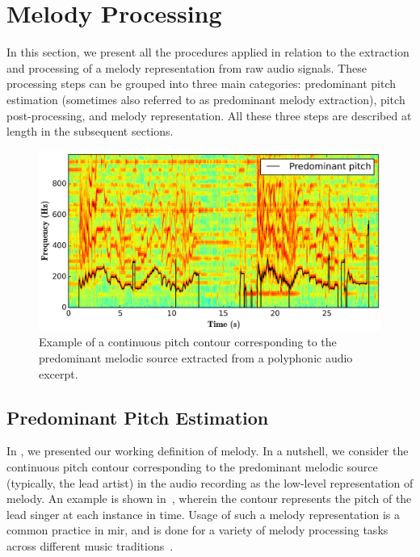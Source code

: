 {\section{Melody Processing}
\label{sec:data_preprocessing_melody_processing}

In this section, we present all the procedures applied in relation to the extraction and processing of a melody representation from raw audio signals. These processing steps can be grouped into three main categories: predominant pitch estimation (sometimes also referred to as predominant melody extraction), pitch post-processing, and melody representation. All these three steps are described at length in the subsequent sections. 

\begin{figure}
	\begin{center}
		\includegraphics[width=\figSizeHundred]{ch05_preprocessing/figures/predominantMelodyExample.png}
	\end{center}
	\caption[Example of the predominant pitch representation of melody]{Example of a continuous pitch contour corresponding to the predominant melodic source extracted from a polyphonic audio excerpt.}
	\label{fig:predominant_melodic_fragment}
\end{figure}


\subsection{Predominant Pitch Estimation}
\label{sec:data_preprocessing_predominant_melody_estimation}

In , we presented our working definition of melody. In a nutshell, we consider the continuous pitch contour corresponding to the predominant melodic source (typically, the lead artist) in the audio recording as the low-level representation of melody. An example is shown in~, wherein the contour represents the pitch of the lead singer at each instance in time. Usage of such a melody representation is a common practice in \gls{mir}, and is done for a variety of melody processing tasks across different music traditions~\citep{Dutta2014,Ishwar2013,Rao2014,koduri2014intonation,senturk2013score,pikrakis2012tracking,pikrakis2003recognition,moelants2009exploring}. 

}
